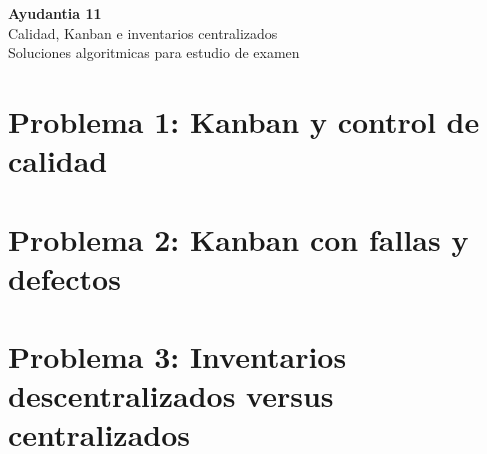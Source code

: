 \documentclass[11pt, a4paper]{article}
\begin{document}
\begin{center}
{\Huge\bfseries\color{gopcyan} Ayudantia 11}\\
{\Large Calidad, Kanban e inventarios centralizados}\\
\vspace{0.2cm}
{\small Soluciones algoritmicas para estudio de examen}
\end{center}

\tableofcontents
\newpage

\section{Problema 1: Kanban y control de calidad}

\section{Problema 2: Kanban con fallas y defectos}

\section{Problema 3: Inventarios descentralizados versus centralizados}
\end{document}
